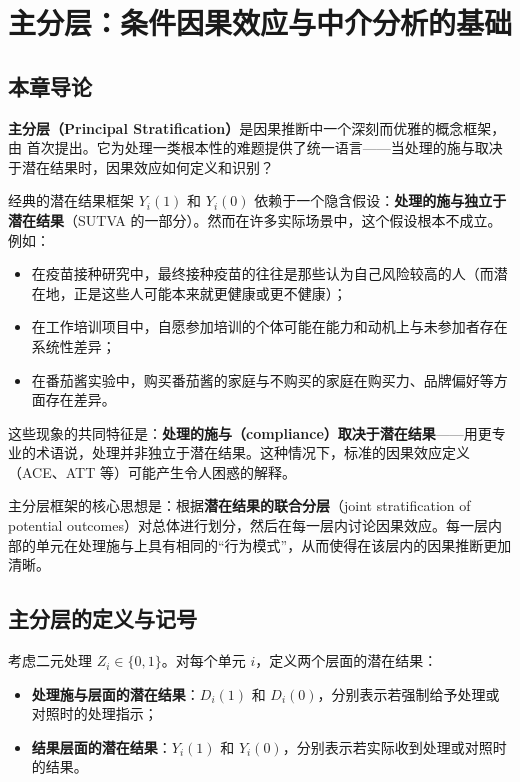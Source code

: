 
\chapter{主分层：条件因果效应与中介分析的基础}\label{ch:26}

\section{本章导论}

\textbf{主分层（Principal Stratification）}是因果推断中一个深刻而优雅的概念框架，由 \cite{RosenbaumRubin:1983b} 首次提出。它为处理一类根本性的难题提供了统一语言——当处理的施与取决于潜在结果时，因果效应如何定义和识别？

经典的潜在结果框架 $Y_i(1)$ 和 $Y_i(0)$ 依赖于一个隐含假设：\textbf{处理的施与独立于潜在结果}（SUTVA 的一部分）。然而在许多实际场景中，这个假设根本不成立。例如：
\begin{itemize}
  \item 在疫苗接种研究中，最终接种疫苗的往往是那些认为自己风险较高的人（而潜在地，正是这些人可能本来就更健康或更不健康）；
  \item 在工作培训项目中，自愿参加培训的个体可能在能力和动机上与未参加者存在系统性差异；
  \item 在番茄酱实验中，购买番茄酱的家庭与不购买的家庭在购买力、品牌偏好等方面存在差异。
\end{itemize}

这些现象的共同特征是：\textbf{处理的施与（compliance）取决于潜在结果}——用更专业的术语说，处理并非独立于潜在结果。这种情况下，标准的因果效应定义（ACE、ATT 等）可能产生令人困惑的解释。

主分层框架的核心思想是：根据\textbf{潜在结果的联合分层}（joint stratification of potential outcomes）对总体进行划分，然后在每一层内讨论因果效应。每一层内部的单元在处理施与上具有相同的``行为模式''，从而使得在该层内的因果推断更加清晰。

\section{主分层的定义与记号}\label{sec:26-basic-setup}

考虑二元处理 $Z_i \in \{0, 1\}$。对每个单元 $i$，定义两个层面的潜在结果：
\begin{itemize}
  \item \textbf{处理施与层面的潜在结果}：$D_i(1)$ 和 $D_i(0)$，分别表示若强制给予处理或对照时的处理指示；
  \item \textbf{结果层面的潜在结果}：$Y_i(1)$ 和 $Y_i(0)$，分别表示若实际收到处理或对照时的结果。
\end{itemize}

